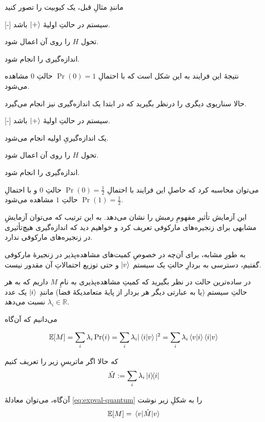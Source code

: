 \documentclass[a4paper,12pt]{article}
\begin{document}
مانندِ مثالِ قبل، یک کیوبیت را تصور کنید 

[-]
 سیستم در حالتِ اولیهٔ 
\(\ket{+}\)
باشد.

 تحول \(H\) را روی آن اعمال شود.

 اندازه‌گیری را انجام شود.

نتیجهٔ این فرایند به این شکل است که با احتمالِ
\(\Pr(0) = 1\)
حالتِ \(0\) مشاهده می‌شود.

حالا سناریوی دیگری را درنظر بگیرید که در ابتدا یک اندازه‌گیری نیز انجام می‌گیرد.

[-]
 سیستم در حالتِ اولیهٔ 
\(\ket{+}\)
باشد.

 یک اندازه‌گیریِ اولیه انجام می‌شود.

 تحول \(H\) را روی آن اعمال شود.

 اندازه‌گیری را انجام شود.

می‌توان محاسبه کرد که حاصلِ این فرایند با احتمالِ
\(\Pr(0) = \frac{1}{2}\)
حالتِ \(0\) و با احتمالِ
\(\Pr(1) = \frac{1}{2}\)
حالتِ \(1\) مشاهده می‌شود.

این آزمایش تأثیرِ مفهومِ رمبش را نشان می‌دهد. به این ترتیب که می‌توان آزمایشِ مشابهی برای زنجیره‌های مارکوفی تعریف کرد و خواهیم دید که اندازه‌گیری هیچ‌تأثیری در زنجیره‌های مارکوفی ندارد.


به طورِ مشابه، برای آن‌چه در خصوصِ کمیت‌های مشاهده‌پذیر در زنجیرهٔ مارکوفی گفتیم، دسترسی به بردارِ حالتِ یک سیستم 
\(\ket{v}\)
و حتی توزیع احتمالاتِ آن مقدور نیست.

در ساده‌ترین حالت در نظر بگیرید که کمیتِ مشاهده‌پذیری به نامِ \(M\) داریم که به هر حالتِ سیستم (یا به عبارتی دیگر هر بردار از پایهٔ متعامد‌یکهٔ فضا) مانندِ 
\(\ket{i}\)
یک عدد 
\(\lambda_i \in \mathbb{R}\)
نسبت می‌دهد.

می‌دانیم که آن‌گاه

\begin{equation} \mathbb{E}[M] = \sum_i \lambda_i \Pr(i) = \sum_i \lambda_i |\braket{i}{v}|^2 = \sum_i \lambda_i \braket{v}{i}\braket{i}{v} 
\label{eq:expval-quantum} \end{equation}

که حالا اگر ماتریسِ زیر را تعریف کنیم
\begin{equation} \hat{M} := \sum_i \lambda_i \dyad{i} \end{equation}

آن‌گاه، می‌توان معادلهٔ 
\ref{eq:expval-quantum}
را به شکلِ زیر نوشت
\begin{equation} \mathbb{E}[M] = \ev{\hat{M}}{v} \end{equation}
\end{document}
